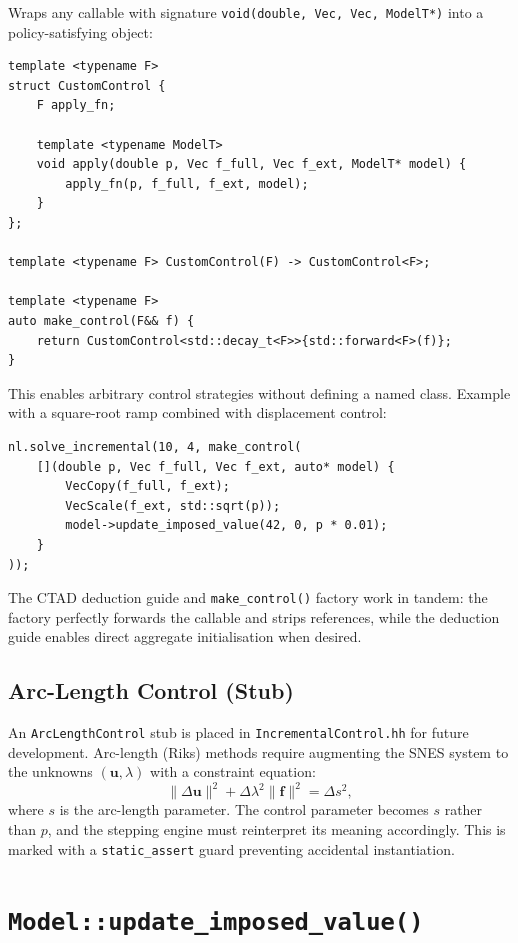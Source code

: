Wraps any callable with signature
\texttt{void(double, Vec, Vec, ModelT*)} into a policy-satisfying
object:

\begin{lstlisting}
template <typename F>
struct CustomControl {
    F apply_fn;

    template <typename ModelT>
    void apply(double p, Vec f_full, Vec f_ext, ModelT* model) {
        apply_fn(p, f_full, f_ext, model);
    }
};

template <typename F> CustomControl(F) -> CustomControl<F>;

template <typename F>
auto make_control(F&& f) {
    return CustomControl<std::decay_t<F>>{std::forward<F>(f)};
}
\end{lstlisting}

This enables arbitrary control strategies without defining a named
class.  Example with a square-root ramp combined with displacement
control:

\begin{lstlisting}
nl.solve_incremental(10, 4, make_control(
    [](double p, Vec f_full, Vec f_ext, auto* model) {
        VecCopy(f_full, f_ext);
        VecScale(f_ext, std::sqrt(p));
        model->update_imposed_value(42, 0, p * 0.01);
    }
));
\end{lstlisting}

The CTAD deduction guide and \texttt{make\_control()} factory work
in tandem: the factory perfectly forwards the callable and strips
references, while the deduction guide enables direct aggregate
initialisation when desired.

\subsection{Arc-Length Control (Stub)}
\label{ssec:ic-arclength}

An \texttt{ArcLengthControl} stub is placed in
\texttt{IncrementalControl.hh} for future development.  Arc-length
(Riks) methods require augmenting the SNES system to the unknowns
$(\mathbf{u}, \lambda)$ with a constraint equation:
\[
  \|\Delta\mathbf{u}\|^2 + \Delta\lambda^2 \|\mathbf{f}\|^2 = \Delta s^2,
\]
where $s$ is the arc-length parameter.  The control parameter becomes
$s$ rather than $p$, and the stepping engine must reinterpret its
meaning accordingly.  This is marked with a \texttt{static\_assert}
guard preventing accidental instantiation.

\section{\texttt{Model::update\_imposed\_value()}}
\label{sec:ic-update-imposed}


